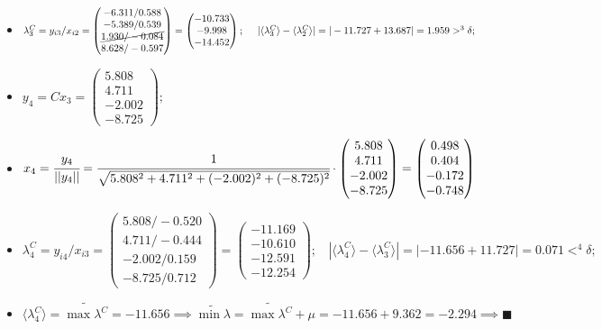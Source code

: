\begin{itemize}
    \item
    $\lambda^C_3 = y_{i3} / x_{i2} =
    \begin{pmatrix}
       -6.311/ 0.588\\
       -5.389/ 0.539\\
        \cancel{1.930/-0.084}\\
        8.628/-0.597
    \end{pmatrix} =
    \begin{pmatrix}
       -10.733\\
        -9.998\\
       -14.452
    \end{pmatrix};~~~~
    |\langle\lambda^C_3\rangle-\langle\lambda^C_2\rangle| = |-11.727+13.687| = 1.959 >^3 \delta;$



    \item
    $y_4 = Cx_3 =
    \begin{pmatrix}
        5.808\\
        4.711\\
       -2.002\\
       -8.725
    \end{pmatrix};$

    \item
    $x_4 = \cfrac{y_4}{||y_4||} = \cfrac{1}{\sqrt{5.808^2+4.711^2+(-2.002)^2+(-8.725)^2}}\cdot
    \begin{pmatrix}
        5.808\\
        4.711\\
        -2.002\\
        -8.725
    \end{pmatrix} =
    \begin{pmatrix}
        0.498\\
        0.404\\
       -0.172\\
       -0.748
    \end{pmatrix}$

    \item
    $\lambda^C_4 = y_{i4} / x_{i3} =
    \begin{pmatrix}
        5.808/-0.520\\
        4.711/-0.444\\
       -2.002/ 0.159 \\
       -8.725/ 0.712
    \end{pmatrix} =
    \begin{pmatrix}
        -11.169\\
        -10.610\\
        -12.591\\
        -12.254
    \end{pmatrix};~~~~
    |\langle\lambda^C_4\rangle-\langle\lambda^C_3\rangle| = |-11.656+11.727| = 0.071 <^4 \delta;$

    \item $\langle\lambda^C_4\rangle = \widetilde{\max{\lambda^C}} = -11.656 \implies
    \widetilde{\min{\lambda}} = \widetilde{\max{\lambda^C}} + \mu = -11.656 + 9.362 = -2.294
    \implies \blacksquare $
\end{itemize}